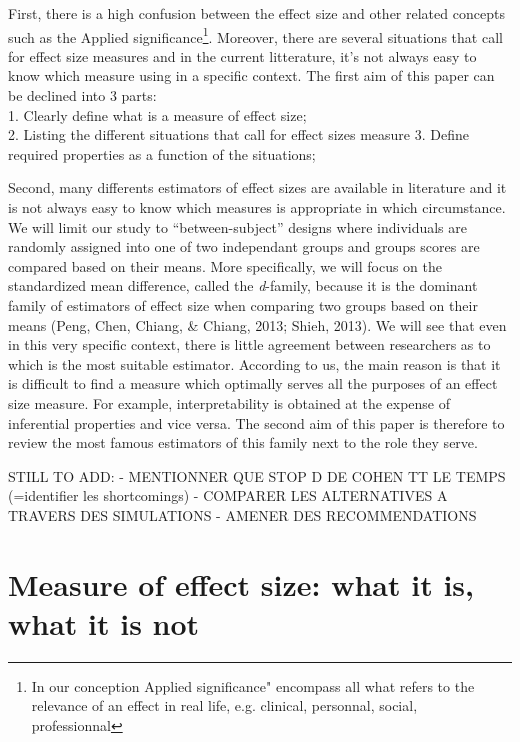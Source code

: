 \documentclass[man]{apa6}
\let\rmarkdownfootnote\footnote%
\def\footnote{\protect\rmarkdownfootnote}
\begin{document}
First, there is a high confusion between the effect size and other related concepts such as the Applied significance\footnote{In our conception  Applied significance" encompass all what refers to the relevance of an effect in real life, e.g. clinical, personnal, social, professionnal}. Moreover, there are several situations that call for effect size measures and in the current litterature, it's not always easy to know which measure using in a specific context. The first aim of this paper can be declined into 3 parts:\\
1. Clearly define what is a measure of effect size;\\
2. Listing the different situations that call for effect sizes measure
3. Define required properties as a function of the situations;

Second, many differents estimators of effect sizes are available in literature and it is not always easy to know which measures is appropriate in which circumstance. We will limit our study to \enquote{between-subject} designs where individuals are randomly assigned into one of two independant groups and groups scores are compared based on their means. More specifically, we will focus on the standardized mean difference, called the \emph{d}-family, because it is the dominant family of estimators of effect size when comparing two groups based on their means (Peng, Chen, Chiang, \& Chiang, 2013; Shieh, 2013). We will see that even in this very specific context, there is little agreement between researchers as to which is the most suitable estimator. According to us, the main reason is that it is difficult to find a measure which optimally serves all the purposes of an effect size measure. For example, interpretability is obtained at the expense of inferential properties and vice versa. The second aim of this paper is therefore to review the most famous estimators of this family next to the role they serve.

STILL TO ADD:
- MENTIONNER QUE STOP D DE COHEN TT LE TEMPS (=identifier les shortcomings)
- COMPARER LES ALTERNATIVES A TRAVERS DES SIMULATIONS
- AMENER DES RECOMMENDATIONS

\hypertarget{measure-of-effect-size-what-it-is-what-it-is-not}{%
\section{Measure of effect size: what it is, what it is not}\label{measure-of-effect-size-what-it-is-what-it-is-not}}
\end{document}
